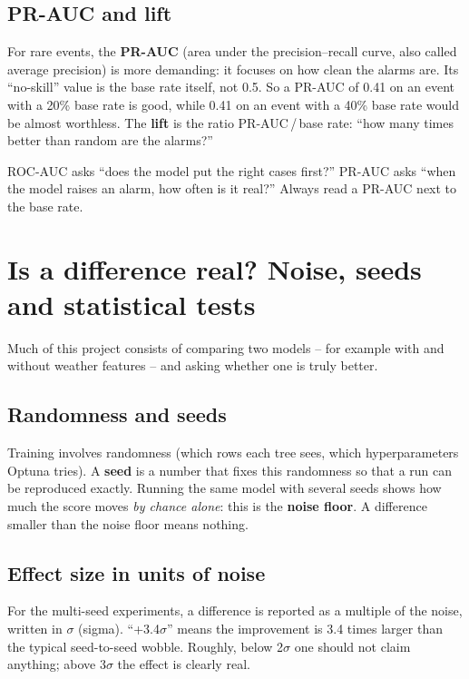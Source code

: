 \documentclass[11pt,a4paper,oneside]{report}
\newcommand{\sig}{\ensuremath{\sigma}}
\begin{document}
\subsection{PR-AUC and lift}

For rare events, the \textbf{PR-AUC} (area under the precision--recall curve,
also called average precision) is more demanding: it focuses on how clean the
alarms are. Its \enquote{no-skill} value is the base rate itself, not 0.5. So a
PR-AUC of 0.41 on an event with a 20\% base rate is good, while 0.41 on an event
with a 40\% base rate would be almost worthless. The \textbf{lift} is the ratio
PR-AUC\,/\,base rate: \enquote{how many times better than random are the alarms?}

\begin{plainbox}
ROC-AUC asks \enquote{does the model put the right cases first?} PR-AUC asks
\enquote{when the model raises an alarm, how often is it real?} Always read a
PR-AUC next to the base rate.
\end{plainbox}

\section{Is a difference real? Noise, seeds and statistical tests}\label{sec:stats}

Much of this project consists of comparing two models -- for example with and
without weather features -- and asking whether one is truly better.

\subsection{Randomness and seeds}

Training involves randomness (which rows each tree sees, which hyperparameters
Optuna tries). A \textbf{seed} is a number that fixes this randomness so that a
run can be reproduced exactly. Running the same model with several seeds shows
how much the score moves \emph{by chance alone}: this is the \textbf{noise
floor}. A difference smaller than the noise floor means nothing.

\subsection{Effect size in units of noise}

For the multi-seed experiments, a difference is reported as a multiple of the
noise, written in \sig{} (sigma). \enquote{+3.4\sig} means the improvement is 3.4
times larger than the typical seed-to-seed wobble. Roughly, below 2\sig{} one
should not claim anything; above 3\sig{} the effect is clearly real.
\end{document}

